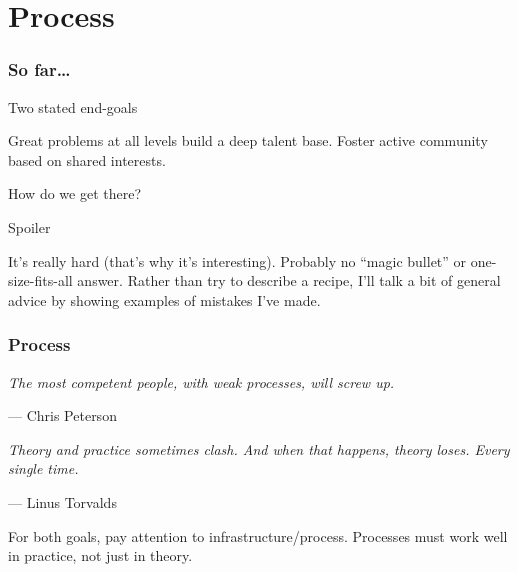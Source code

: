 \documentclass[10pt]{beamer}
\begin{document}
\section{Process}
\begin{frame}
  \frametitle{So far\dots}
  \begin{block}{Two stated end-goals}
    \begin{itemize}
      \ii Great problems at all levels build a deep talent base.
      \ii Foster active community based on shared interests.
    \end{itemize}
    How do we get there?
  \end{block}
  \pause
  \begin{alertblock}{Spoiler}
    \begin{itemize}
      \ii It's really hard (that's why it's interesting).
      \ii Probably no ``magic bullet'' or one-size-fits-all answer.
      \ii Rather than try to describe a recipe,
      I'll talk a bit of general advice by showing examples of mistakes I've made.
    \end{itemize}
  \end{alertblock}
\end{frame}
\begin{frame}
  \frametitle{Process}
  \begin{block}{}
    {\slshape
      The most competent people, with weak processes, will screw up.}

    \bigskip \hspace{2em} --- Chris Peterson
  \end{block}
  \begin{block}{}
    {\slshape
      Theory and practice sometimes clash.
      And when that happens, theory loses.
      Every single time.}

    \bigskip \hspace{2em} --- Linus Torvalds
  \end{block}
  \begin{itemize}
    \ii For both goals, pay attention to infrastructure/process.
    \ii Processes must work well in practice, not just in theory.
  \end{itemize}
\end{frame}
\end{document}

